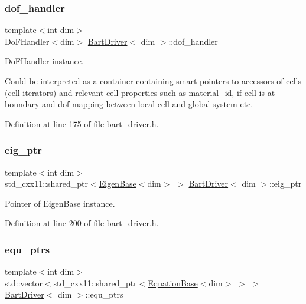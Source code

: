 \subsubsection{\texorpdfstring{dof\+\_\+handler}{dof\_handler}}
{\footnotesize\ttfamily template$<$int dim$>$ \\
Do\+F\+Handler$<$dim$>$ \hyperlink{class_bart_driver}{Bart\+Driver}$<$ dim $>$\+::dof\+\_\+handler\hspace{0.3cm}{\ttfamily [private]}}



Do\+F\+Handler instance. 

Could be interpreted as a container containing smart pointers to accessors of cells (cell iterators) and relevant cell properties such as material\+\_\+id, if cell is at boundary and dof mapping between local cell and global system etc. 

Definition at line 175 of file bart\+\_\+driver.\+h.

\mbox{\label{class_bart_driver_a90adc0f013f07a10c5d423e3506bd589}} 
\subsubsection{\texorpdfstring{eig\+\_\+ptr}{eig\_ptr}}
{\footnotesize\ttfamily template$<$int dim$>$ \\
std\+\_\+cxx11\+::shared\+\_\+ptr$<$\hyperlink{class_eigen_base}{Eigen\+Base}$<$dim$>$ $>$ \hyperlink{class_bart_driver}{Bart\+Driver}$<$ dim $>$\+::eig\+\_\+ptr\hspace{0.3cm}{\ttfamily [private]}}



Pointer of Eigen\+Base instance. 



Definition at line 200 of file bart\+\_\+driver.\+h.

\mbox{\label{class_bart_driver_a0a6f52aed8e9c22da12a99653d1acba8}} 
\subsubsection{\texorpdfstring{equ\+\_\+ptrs}{equ\_ptrs}}
{\footnotesize\ttfamily template$<$int dim$>$ \\
std\+::vector$<$std\+\_\+cxx11\+::shared\+\_\+ptr$<$\hyperlink{class_equation_base}{Equation\+Base}$<$dim$>$ $>$ $>$ \hyperlink{class_bart_driver}{Bart\+Driver}$<$ dim $>$\+::equ\+\_\+ptrs\hspace{0.3cm}{\ttfamily [private]}}



